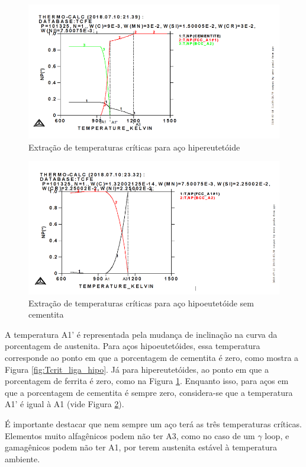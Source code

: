 \documentclass[brazil,tese,epusp]{usp}
\begin{document}
\begin{figure}
  \includegraphics[width=.9\textwidth]{img/4321editado.png}
  \caption{Extração de temperaturas críticas para aço hipereutetóide}
  \label{fig:Tcrit_liga_hiper}
\end{figure}

\begin{figure}
  \includegraphics[width=.9\textwidth]{img/418editado.png}
  \caption{Extração de temperaturas críticas para aço hipoeutetóide sem cementita}
  \label{fig:Tcrit_liga_sem_cementita}
\end{figure}

A temperatura A1' é representada pela mudança de inclinação na curva da porcentagem de austenita. Para aços hipoeutetóides, essa temperatura corresponde ao ponto em que a porcentagem de cementita é zero, como mostra a Figura \ref{fig:Tcrit_liga_hipo}. Já para hipereutetóides, ao ponto em que a porcentagem de ferrita é zero, como na Figura \ref{fig:Tcrit_liga_hiper}. Enquanto isso, para aços em que a porcentagem de cementita é sempre zero, considera-se que a temperatura A1' é igual à A1 (vide Figura \ref{fig:Tcrit_liga_sem_cementita}).

É importante destacar que nem sempre um aço terá as três temperaturas críticas. Elementos muito alfagênicos podem não ter A3, como no caso de um $\gamma$ loop, e gamagênicos podem não ter A1, por terem austenita estável à temperatura ambiente.
\end{document}
